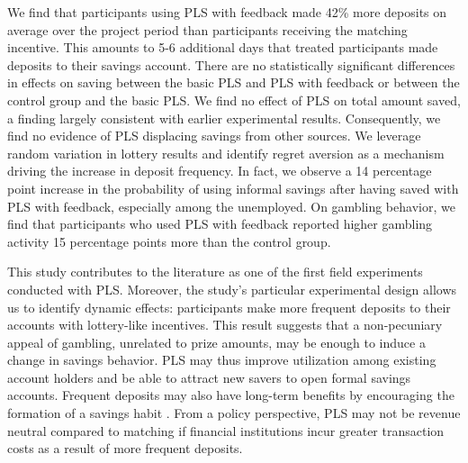 \documentclass[11pt]{article}
\begin{document}
	We find that participants using PLS with feedback made 42\% more deposits on average over the project period than participants receiving the matching incentive. This amounts to 5-6 additional days that treated participants made deposits to their savings account. There are no statistically significant differences in effects on saving between the basic PLS and PLS with feedback or between the control group and the basic PLS. We find no effect of PLS on total amount saved, a finding largely consistent with earlier experimental results. Consequently, we find no evidence of PLS displacing savings from other sources. We leverage random variation in lottery results and identify regret aversion as a mechanism driving the increase in deposit frequency. In fact, we observe a 14 percentage point increase in the probability of using informal savings after having saved with PLS with feedback, especially among the unemployed. On gambling behavior, we find that participants who used PLS with feedback reported higher gambling activity 15 percentage points more than the control group.


	This study contributes to the literature as one of the first field experiments conducted with PLS. Moreover, the study's particular experimental design allows us to identify dynamic effects: participants make more frequent deposits to their accounts with lottery-like incentives. This result suggests that a non-pecuniary appeal of gambling, unrelated to prize amounts, may be enough to induce a change in savings behavior. PLS may thus improve utilization among existing account holders and be able to attract new savers to open formal savings accounts. Frequent deposits may also have long-term benefits by encouraging the formation of a savings habit \parencite{alessie_saving_2009}. From a policy perspective, PLS may not be revenue neutral compared to matching if financial institutions incur greater transaction costs as a result of more frequent deposits.

\end{document}
